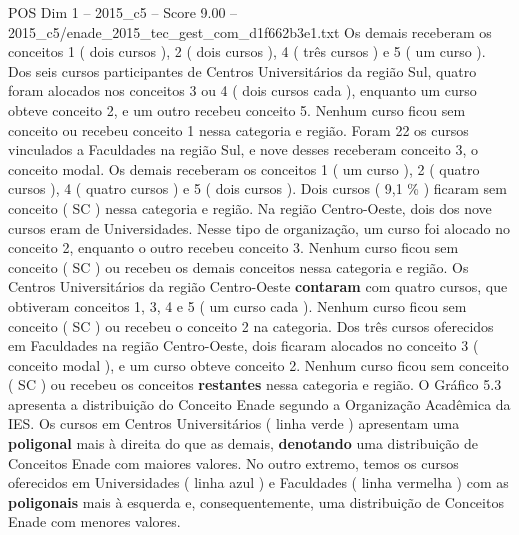 \begin{textsample}{POS Dim 1 – 2015\_c5 – Score 9.00 – 2015\_c5/enade\_2015\_tec\_gest\_com\_d1f662b3e1.txt}
Os demais receberam os conceitos 1 ( dois cursos ), 2 ( dois cursos ), 4 ( três cursos ) e 5 ( um curso ).
Dos seis cursos participantes de Centros Universitários da região Sul, quatro foram alocados nos conceitos 3 ou 4 ( dois cursos cada ), enquanto um curso obteve conceito 2, e um outro recebeu conceito 5.
Nenhum curso ficou sem conceito ou recebeu conceito 1 nessa categoria e região.
Foram 22 os cursos vinculados a Faculdades na região Sul, e nove desses receberam conceito 3, o conceito modal.
Os demais receberam os conceitos 1 ( um curso ), 2 ( quatro cursos ), 4 ( quatro cursos ) e 5 ( dois cursos ).
Dois cursos ( 9,1 \% ) ficaram sem conceito ( SC ) nessa categoria e região.
Na região Centro-Oeste, dois dos nove cursos eram de Universidades.
Nesse tipo de organização, um curso foi alocado no conceito 2, enquanto o outro recebeu conceito 3.
Nenhum curso ficou sem conceito ( SC ) ou recebeu os demais conceitos nessa categoria e região.
Os Centros Universitários da região Centro-Oeste \textbf{contaram} com quatro cursos, que obtiveram conceitos 1, 3, 4 e 5 ( um curso cada ).
Nenhum curso ficou sem conceito ( SC ) ou recebeu o conceito 2 na categoria.
Dos três cursos oferecidos em Faculdades na região Centro-Oeste, dois ficaram alocados no conceito 3 ( conceito modal ), e um curso obteve conceito 2.
Nenhum curso ficou sem conceito ( SC ) ou recebeu os conceitos \textbf{restantes} nessa categoria e região.
O Gráfico 5.3 apresenta a distribuição do Conceito Enade segundo a Organização Acadêmica da IES.
Os cursos em Centros Universitários ( linha verde ) apresentam uma \textbf{poligonal} mais à direita do que as demais, \textbf{denotando} uma distribuição de Conceitos Enade com maiores valores.
No outro extremo, temos os cursos oferecidos em Universidades ( linha azul ) e Faculdades ( linha vermelha ) com as \textbf{poligonais} mais à esquerda e, consequentemente, uma distribuição de Conceitos Enade com menores valores.

\end{textsample}

